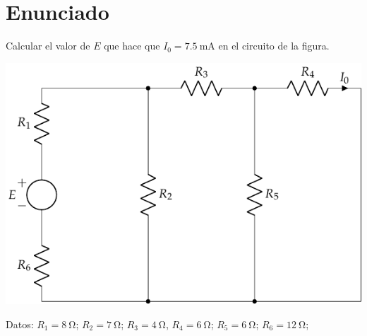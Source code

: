
  \section{Enunciado}
  Calcular el valor de $E$ que hace que $I_0=\qty{7.5}{\milli\ampere}$
  en el circuito de la figura.

  \begin{center}
    \includegraphics{figuras/BT1_03.pdf}
  \end{center}

  Datos: $R_1 = \qty{8}{\ohm}$; $R_2 = \qty{7}{\ohm}$; $R_3 = \qty{4}{\ohm}$, $R_4 = \qty{6}{\ohm}$; $R_5 = \qty{6}{\ohm}$; $R_6 = \qty{12}{\ohm}$; 

